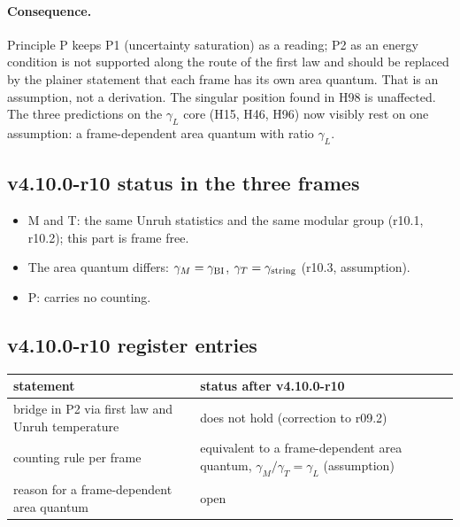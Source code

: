 \paragraph{Consequence.}
Principle P keeps P1 (uncertainty saturation) as a reading; P2 as an energy condition is not supported along the route of the first law and should be
replaced by the plainer statement that each frame has its own area quantum.  That is an assumption, not a derivation.  The singular position found in
H98 is unaffected.  The three predictions on the \(\gamma_L\) core (H15, H46, H96) now visibly rest on one assumption: a frame-dependent area quantum with
ratio \(\gamma_L\).

\subsection*{v4.10.0-r10 status in the three frames}
\label{subsec:v4100-r10-frames}

\begin{itemize}[leftmargin=2em]
\item M and T: the same Unruh statistics and the same modular group (r10.1, r10.2); this part is frame free.
\item The area quantum differs: \(\gamma_M=\gamma_{\rm BI}\), \(\gamma_T=\gamma_{\rm string}\) (r10.3, assumption).
\item P: carries no counting.
\end{itemize}

\subsection*{v4.10.0-r10 register entries}
\label{subsec:v4100-r10-register}

\begin{center}
\small
\begin{tabular}{@{}>{\raggedright\arraybackslash}p{}>{\raggedright\arraybackslash}p{}@{}}
\toprule
statement & status after v4.10.0-r10\\
\midrule
bridge in P2 via first law and Unruh temperature & does not hold (correction to r09.2)\\
counting rule per frame & equivalent to a frame-dependent area quantum, \(\gamma_M/\gamma_T=\gamma_L\) (assumption)\\
reason for a frame-dependent area quantum & open\\
\bottomrule
\end{tabular}
\end{center}

